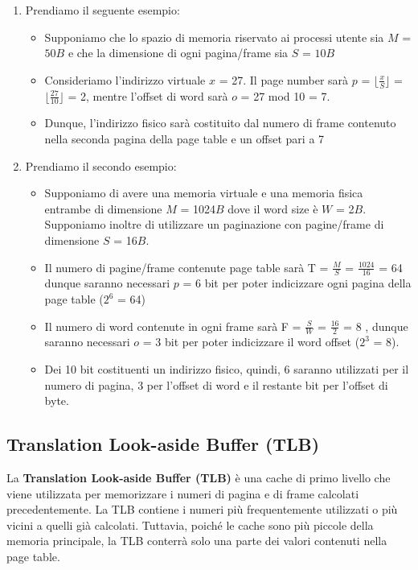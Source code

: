 \documentclass{article}
\begin{document}
\begin{enumerate}
    \item Prendiamo il seguente esempio:
    \begin{itemize}
        \item Supponiamo che lo spazio di memoria riservato ai processi utente sia $M$ = $50B$ e che la dimensione di ogni pagina/frame sia $S$ = $10B$
        \item Consideriamo l'indirizzo virtuale $x$ = 27. Il page number sarà $p$ = $\lfloor \frac{x}{S}\rfloor$  = $\lfloor \frac{27}{10}\rfloor$ = 2, 
        mentre l'offset di word sarà $o$ = 27 mod 10 = 7.
        \item Dunque, l'indirizzo fisico sarà costituito dal numero di frame contenuto nella seconda pagina della page table e un offset pari a 7
    \end{itemize}
    \item Prendiamo il secondo esempio:
    \begin{itemize}
        \item Supponiamo di avere una memoria virtuale e una memoria fisica entrambe di dimensione $M$ = 1024$B$ dove il word size è $W$ = 2$B$. Supponiamo inoltre di utilizzare un paginazione con pagine/frame di dimensione $S$ = 16$B$.
        \item  Il numero di pagine/frame contenute page table sarà T = $\frac{M}{S}$ = $\frac{1024}{16}$ = 64 dunque saranno necessari $p$ = 6 bit per poter indicizzare ogni pagina della page table ($2^{6}$ = 64)
        \item Il numero di word contenute in ogni frame sarà F = $\frac{S}{W}$ = $\frac{16}{2}$ = 8 , dunque saranno necessari $o$ = 3 bit per poter indicizzare il word offset ($2^{3}$ = 8).
        \item Dei 10 bit costituenti un indirizzo fisico, quindi, 6 saranno utilizzati per il
        numero di pagina, 3 per l'offset di word e il restante bit per l'offset di byte.
    \end{itemize}
\end{enumerate}
\pagebreak
\subsection{Translation Look-aside Buffer (TLB)}
La \textbf{Translation Look-aside Buffer (TLB)} è una cache di primo livello che viene utilizzata per memorizzare i numeri di pagina e di frame calcolati precedentemente. La TLB contiene i numeri più frequentemente utilizzati o più vicini a quelli già calcolati. Tuttavia, poiché le cache sono più piccole della memoria principale, la TLB conterrà solo una parte dei valori contenuti nella page table.\par
\end{document}
